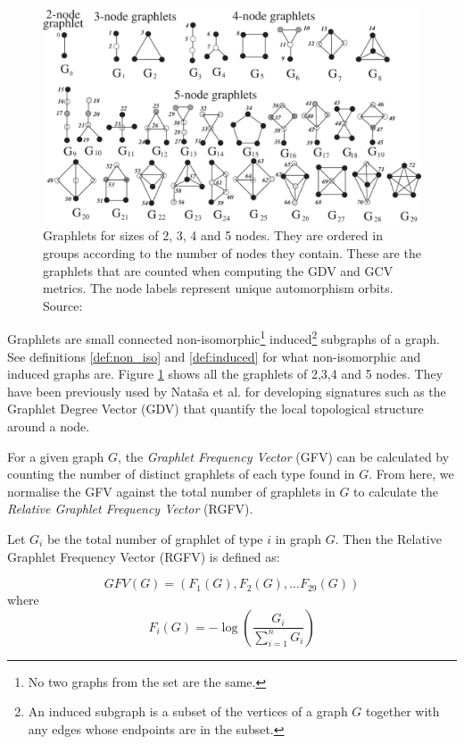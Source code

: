 \begin{figure}[h]
  \centering
\includegraphics[scale=0.36]{images/graphlets.jpg}
\caption[Graphlets for sizes of 2, 3, 4 and 5 nodes]{Graphlets for sizes of 2, 3, 4 and 5 nodes. They are ordered in
groups according to the number of nodes they contain. These are the graphlets that are counted when computing
the GDV and GCV metrics. The node labels represent unique automorphism orbits. Source: \cite{milenkoviae2008uncovering} }
\label{fig:graphlets}
\end{figure}

Graphlets are small connected non-isomorphic\footnote{No two graphs from the set are the same.} induced\footnote{An induced subgraph is a subset of the vertices of a graph $G$ together with any edges whose endpoints are in the subset.} subgraphs of a graph. See definitions \ref{def:non_iso} and \ref{def:induced} for what non-isomorphic and induced graphs are. Figure \ref{fig:graphlets} shows all the graphlets of 2,3,4 and 5 nodes. They have been previously used by Nata\v{s}a et al. \cite{milenkoviae2008uncovering,prvzulj2007biological} for developing signatures such as the Graphlet Degree Vector (GDV) that quantify the local topological structure around a node.

For a given graph $G$, the \emph{Graphlet Frequency Vector} (GFV) can be calculated by
counting the number of distinct graphlets of each type found in $G$.
From here, we normalise the GFV against the total number of graphlets in $G$ to
calculate the \emph{Relative Graphlet Frequency Vector} (RGFV).

\begin{mydef}
\label{def:rgfv}
Let $G_i$ be the total number of graphlet of type $i$ in graph $G$. Then the Relative Graphlet Frequency Vector (RGFV) is defined as:

\begin{equation}
 GFV(G) = \left(F_1(G), F_2(G), ... F_{29}(G)\right)
\end{equation}
where 
$$ F_i(G) = -\log\left(\frac{G_i}{\sum_{i=1}^{n}G_i}\right) $$

\end{mydef}


